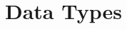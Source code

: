 \documentclass[../lecture2-variables.tex]{subfiles}
\begin{document}
\section{Data Types}


\begin{frame}[fragile]{}

\end{frame}


\begin{frame}[fragile]{}



\end{frame}


\begin{frame}[fragile]{}



\end{frame}


\begin{frame}[fragile]{}

\end{frame}


\begin{frame}[fragile]{}

\end{frame}

\end{document}
